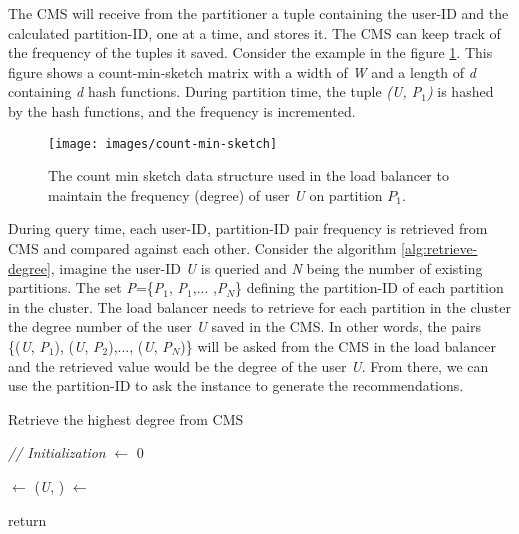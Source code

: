 The CMS will receive from the partitioner a tuple containing the user-ID and the calculated partition-ID, one at a time, and stores it. The CMS can keep track of the frequency of the tuples it saved. Consider the example in the figure \ref{fig:count-min-sketch}. This figure shows a count-min-sketch matrix with a width of \emph{W} and a length of \emph{d} containing \emph{d} hash functions. During partition time, the tuple \emph{(\emph{U}, \emph{P$_1$})} is hashed by the hash functions, and the frequency is incremented.

\begin{figure}[!ht]
    \centering
    \texttt{[image: images/count-min-sketch]}
    \caption{The count min sketch data structure used in the load balancer to maintain the frequency (degree) of user \emph{U} on partition \emph{$P_1$}.}
    \label{fig:count-min-sketch}
\end{figure}


During query time, each user-ID, partition-ID pair frequency is retrieved from CMS and compared against each other. Consider the algorithm \ref{alg:retrieve-degree}, imagine the user-ID \emph{U} is queried and \emph{N} being the number of existing partitions. The set \emph{P}=\{\emph{P$_1$}, \emph{P$_1$},... ,\emph{P$_N$}\} defining the partition-ID of each partition in the cluster. The load balancer needs to retrieve for each partition in the cluster the degree number of the user \emph{U} saved in the CMS. In other words, the pairs \{(\emph{U}, \emph{P$_1$}), (\emph{U}, \emph{P$_2$}),..., (\emph{U}, \emph{P$_N$})\} will be asked from the CMS in the load balancer and the retrieved value would be the degree of the user \emph{U}. From there, we can use the partition-ID to ask the instance to generate the recommendations.


\begin{algorithm}[!ht]
    \caption{Retrieve the highest degree from CMS}
    \label{alg:retrieve-degree}




    \SetAlgoLined

    \BlankLine\emph{// Initialization}\BlankLine
    \degree $\leftarrow$ 0 \;

    \BlankLine
    {
        \tuple $\leftarrow$ (\emph{U}, \partitionId)\;
        \count $\leftarrow$ \;
        \If{ \count $>$ \degree}{
                \degree $\leftarrow$ \count \;
                \partitionToAsk $\leftarrow$ $\partitionId$ \;
            }
    }

    return \partitionToAsk \;

    \BlankLine
\end{algorithm}


